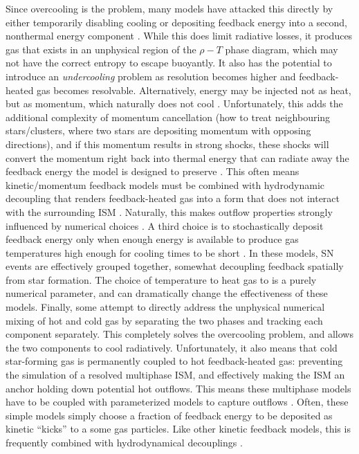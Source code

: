Since overcooling is the problem, many models have attacked this directly by
either temporarily disabling cooling \citep{Thacker2000,Stinson2006} or
depositing feedback energy into a second, nonthermal energy component
\citep{Agertz2013}.  While this does limit radiative losses, it produces gas
that exists in an unphysical region of the $\rho-T$ phase diagram, which may not
have the correct entropy to escape buoyantly.  It also has the potential to
introduce an \textit{undercooling} problem as resolution becomes higher and
feedback-heated gas becomes resolvable.  Alternatively, energy may be injected
not as heat, but as momentum, which naturally does not cool
\citep{Scannapieco2006,DallaVecchia2008,Dubois2008}.  Unfortunately, this adds
the additional complexity of momentum cancellation (how to treat neighbouring
stars/clusters, where two stars are depositing momentum with opposing
directions), and if this momentum results in strong shocks, these shocks will
convert the momentum right back into thermal energy that can radiate away the
feedback energy the model is designed to preserve \citep{Durier2012}.  This
often means kinetic/momentum feedback models must be combined with hydrodynamic
decoupling that renders feedback-heated gas into a form that does not interact
with the surrounding ISM \citep{Springel2003,Vogelsberger2013}.  Naturally, this
makes outflow properties strongly influenced by numerical choices
\citep{DallaVecchia2008}.  A third choice is to stochastically deposit feedback
energy only when enough energy is available to produce gas temperatures high
enough for cooling times to be short \citep{DallaVecchia2012,Crain2015}.  In
these models, SN events are effectively grouped together, somewhat decoupling
feedback spatially from star formation.  The choice of temperature to heat gas
to is a purely numerical parameter, and can dramatically change the
effectiveness of these models.  Finally, some \citep{Springel2003,Murante2015}
attempt to directly address the unphysical numerical mixing of hot and cold gas
by separating the two phases and tracking each component separately.  This
completely solves the overcooling problem, and allows the two components to cool
radiatively.   Unfortunately, it also means that cold star-forming gas is
permanently coupled to hot feedback-heated gas: preventing the simulation of  a
resolved multiphase ISM, and effectively making the ISM an anchor holding down
potential hot outflows.  This means these multiphase models have to be coupled
with parameterized models to capture outflows \citep{Springel2003}.  Often,
these simple models simply choose a fraction of feedback energy to be deposited
as kinetic ``kicks'' to a some gas particles.  Like other kinetic feedback
models, this is frequently combined with hydrodynamical decouplings
\citep{Vogelsberger2013}.

